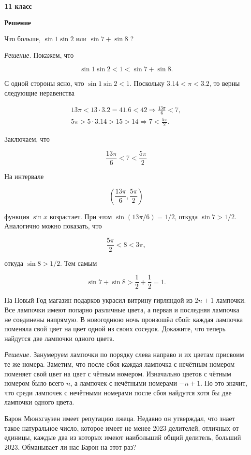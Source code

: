 \centerline{\bf \huge 11 класс}

\centerline{\bf \huge Решение}

Что больше, $\sin 1 \sin 2$ или $\sin 7+\sin 8$ ?

\textit{Решение.}
Покажем, что

$$
\sin 1 \sin 2<1<\sin 7+\sin 8 .
$$


С одной стороны ясно, что $\sin 1 \sin 2<1$. Поскольку $3.14<\pi<3.2$, то верны следующие неравенства

$$
\begin{gathered}
13 \pi<13 \cdot 3.2=41.6<42 \Rightarrow \frac{13 \pi}{6}<7, \\
5 \pi>5 \cdot 3.14>15>14 \Rightarrow 7<\frac{5 \pi}{2} .
\end{gathered}
$$


Заключаем, что

$$
\frac{13 \pi}{6}<7<\frac{5 \pi}{2}
$$


На интервале

$$
\left(\frac{13 \pi}{6}, \frac{5 \pi}{2}\right)
$$


функция $\sin x$ возрастает. При этом $\sin (13 \pi / 6)=1 / 2$, откуда $\sin 7>1 / 2$. Аналогично можно показать, что

$$
\frac{5 \pi}{2}<8<3 \pi,
$$


откуда $\sin 8>1 / 2$. Тем самым

$$
\sin 7+\sin 8>\frac{1}{2}+\frac{1}{2}=1 .
$$

На Новый Год магазин подарков украсил витрину гирляндой из $2 n+1$ лампочки. Все лампочки имеют попарно различные цвета, а первая и последняя лампочка не соединены напрямую. В новогоднюю ночь произошёл сбой: каждая лампочка поменяла свой цвет на цвет одной из своих соседок. Докажите, что теперь найдутся две лампочки одного цвета.


\textit{Решение.}
Занумеруем лампочки по порядку слева направо и их цветам присвоим те же номера. Заметим, что после сбоя каждая лампочка с нечётным номером поменяет свой цвет на цвет с чётным номером. Изначально цветов с чётным номером было всего $n$, а лампочек с нечётными номерами $-n+1$. Но это значит, что среди лампочек с нечётными номерами после сбоя найдутся хотя бы две лампочки одного цвета.


Барон Мюнхгаузен имеет репутацию лжеца. Недавно он утверждал, что знает такое натуральное число, которое имеет не менее 2023 делителей, отличных от единицы, каждые два из которых имеют наибольший общий делитель, больший 2023. Обманывает ли нас Барон на этот раз?


